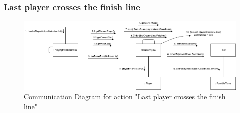 		\subsubsection{Last player crosses the finish line}
			\begin{figure}[H]
				\centering
				\includegraphics[width=14cm,keepaspectratio,center]{img/Design-Artifacts_Communication-Diagrams_Game-Ends.png}
				\caption{Communication Diagram for action "Last player crosses the finish line"}
			\end{figure}

